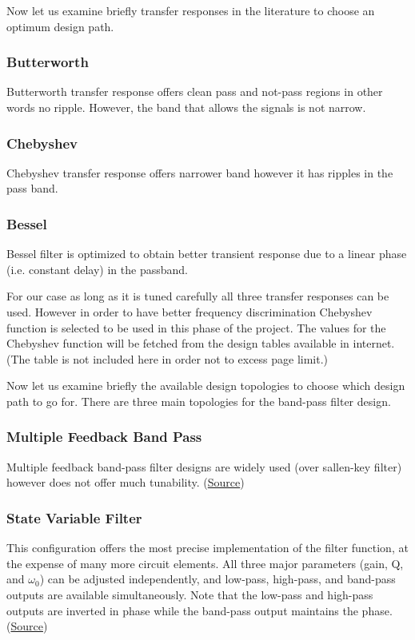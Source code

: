 \documentclass[letterpaper,12pt]{article}
\begin{document}
Now let us examine briefly transfer responses in the literature to choose an optimum design path.
\subsubsection{Butterworth}
Butterworth transfer response offers clean pass and not-pass regions in other words no ripple. However, the band that allows the signals is not narrow.
\subsubsection{Chebyshev}
Chebyshev transfer response offers narrower band however it has ripples in the pass band.
\subsubsection{Bessel}
Bessel filter is optimized to obtain better transient response due to a linear phase (i.e.
constant delay) in the passband.

\vspace{4mm}
For our case as long as it is tuned carefully all three transfer responses can be used. However in order to have  better frequency discrimination Chebyshev function is selected to be used in this phase of the project. The values for the Chebyshev function will be fetched from the design tables available in internet. (The table is not included here in order not to excess page limit.)

\vspace{4mm}
Now let us examine briefly the available design topologies to choose which design path to go for. There are three main topologies for the  band-pass filter design.

\subsubsection{Multiple Feedback Band Pass}
Multiple feedback band-pass filter designs are widely used (over sallen-key filter) however does not offer much tunability. (\href{https://www.analog.com/media/en/training-seminars/tutorials/mt-220.pdf}{Source})

\subsubsection{State Variable Filter}

This configuration offers the most precise implementation
of the filter function, at the expense of many more circuit
elements. All three major parameters (gain, Q, and \(\omega_0\)) can be adjusted independently, and low-pass, high-pass, and band-pass outputs are available simultaneously. Note that the low-pass and high-pass outputs are inverted in phase while the band-pass output maintains the phase. (\href{https://www.analog.com/media/en/training-seminars/tutorials/MT-223.pdf}{Source})
\end{document}
